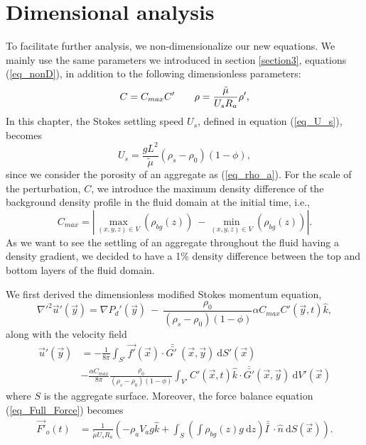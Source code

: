 \section{Dimensional analysis}
To facilitate further analysis, we non-dimensionalize our new equations. We mainly use the same parameters we introduced in section \ref{section3}, equations (\ref{eq_nonD}), in addition to the following dimensionless parameters:
\begin{equation}
	C= C_{max} C'
\hspace{7mm}
\rho = \frac{\tilde{\mu}  }{{U_s} R_a}  \rho', 
\end{equation}
In this chapter, the Stokes settling speed $U_s$, defined in equation (\ref{eq_U_s}), becomes
\[
U_s = \frac{g  L^2}{\tilde{\mu}}(\rho_s - \rho_0)(1-\phi),
\] 
since we consider the porosity of an aggregate as (\ref{eq_rho_a}).
For the scale of the perturbation, $C$, we introduce the maximum density difference of the background density profile in the fluid domain at the initial time, i.e., 
\[
C_{max} = 
\left|
\max_{(x,y,z) \in V} \left(\rho_{bg}(z)  \right)
\ - \min_{(x,y,z) \in V} \left(\rho_{bg}(z)  \right) \right|.
\] 
As we want to see the settling of an aggregate throughout the fluid having a density gradient, we decided to have a 1\% density difference between the top and bottom layers of the fluid domain.
\par
We first derived the dimensionless modified Stokes momentum equation,
\begin{equation}
	{\nabla'}^2  \vec{u}'(\vec{y})
	= \nabla {P_d}'(\vec{y}) \ - \  
	\frac{\rho_0}{(\rho_s - \rho_0)(1-\phi)} \alpha C_{max} C'\left(\vec{y},t \right)   \hat{k},
\label{eq_extra_C_nonD}
\end{equation}
along with the velocity field
 \begin{align}
		\vec{u}'(\vec{y})
			  & =- \frac{1}{8 \pi} \int_{S'}  
			 \vec{f'}(\vec{x}) 
			 \cdot \bar{\bar{G' \ }} (\vec{x},\vec{y}) 
			 \ \textrm{d}S'(\vec{x})
			 \nonumber \\
& -\frac{ \alpha C_{max}}{8\pi } \frac{\rho_0}{(\rho_s - \rho_0)(1-\phi)} 
\int_{V'} C' \left(\vec{x},  t \right) \hat{k} \cdot 
\bar{\bar{G'  }}(\vec{x}, \vec{y} ) 
\ \text{d}V'(\vec{x})
  \label{eq_vel_all_onS_nonD}
 \end{align}
where $S$ is the aggregate surface. 
Moreover, the force balance equation (\ref{eq_Full_Force}) becomes
\begin{align}
	 \vec{F'}_o(t)
	 & =
	  \frac{1}{\tilde{\mu} U_s R_a} 
	  \left(
	-   \rho_a V_a g \hat{k}
	  +
	   \int_{S} \left( 
	   \int \rho_{bg}(z) g \ \textrm{d}z 
	   \right) \bar{\bar{I \ }}  \cdot
	  \hat{n} \ \textrm{d}S (\vec{x})
	\right).
\label{eq_Full_Force_nonD}
\end{align}

